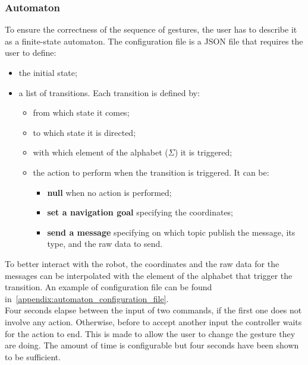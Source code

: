 \documentclass[../thesis.tex]{subfiles}
\begin{document}
\subsubsection{Automaton}\label{sss:automaton_methodology}
To ensure the correctness of the sequence of gestures, the user has to describe it as a finite-state automaton. The configuration file is a JSON file that requires the user to define:
\begin{itemize}
    \item the initial state;
    \item a list of transitions. Each transition is defined by:
    \begin{itemize}
        \item from which state it comes;
        \item to which state it is directed;
        \item with which element of the alphabet ($\Sigma$) it is triggered;
        \item the action to perform when the transition is triggered. It can be:
        \begin{itemize}
            \item \textbf{null} when no action is performed;
            \item \textbf{set a navigation goal} specifying the coordinates;
            \item \textbf{send a message} specifying on which topic publish the message, its type, and the raw data to send.
        \end{itemize}
    \end{itemize}
\end{itemize}
To better interact with the robot, the coordinates and the raw data for the messages can be interpolated with the element of the alphabet that trigger the transition. An example of configuration file can be found in~\ref{appendix:automaton_configuration_file}.\\

Four seconds elapse between the input of two commands, if the first one does not involve any action. Otherwise, before to accept another input the controller waits for the action to end. This is made to allow the user to change the gesture they are doing. The amount of time is configurable but four seconds have been shown to be sufficient.\\
\end{document}
